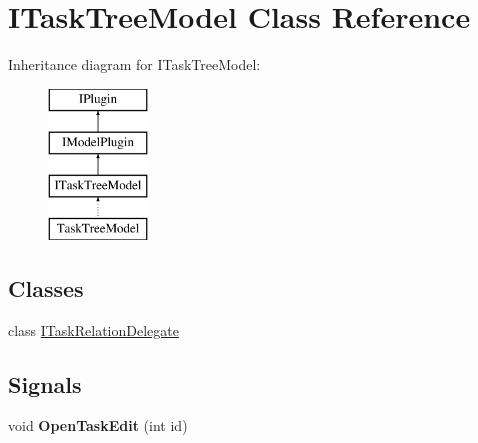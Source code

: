 \hypertarget{class_i_task_tree_model}{}\section{I\+Task\+Tree\+Model Class Reference}
\label{class_i_task_tree_model}
Inheritance diagram for I\+Task\+Tree\+Model\+:\begin{figure}[H]
\begin{center}
\leavevmode
\includegraphics[height=4.000000cm]{class_i_task_tree_model}
\end{center}
\end{figure}
\subsection*{Classes}
\begin{DoxyCompactItemize}
\item 
class \hyperlink{class_i_task_tree_model_1_1_i_task_relation_delegate}{I\+Task\+Relation\+Delegate}
\end{DoxyCompactItemize}
\subsection*{Signals}
\begin{DoxyCompactItemize}
\item 
\mbox{\label{class_i_task_tree_model_a562d5278962363c02872c528b839a0c8}} 
void {\bfseries Open\+Task\+Edit} (int id)
\end{DoxyCompactItemize}
